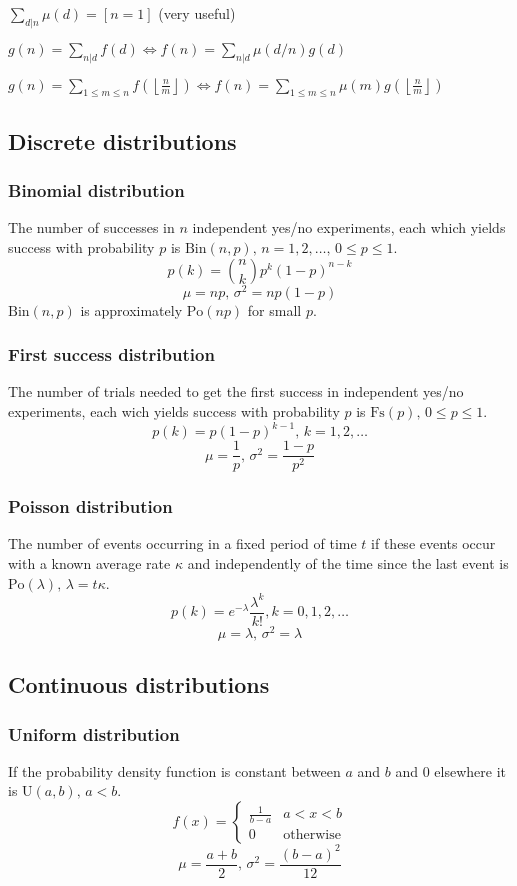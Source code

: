 \documentclass[
	a4paper,
	landscape,
	10pt,
]{article}
\begin{document}
\begin{multicols}{3}
  $ \sum_{d | n} \mu(d) = [ n = 1] $ (very useful)

  $ g(n) = \sum_{n|d} f(d) \Leftrightarrow f(n) = \sum_{n|d} \mu(d/n)g(d)$

 $ g(n) = \sum_{1 \leq m \leq n} f(\left\lfloor\frac{n}{m}\right \rfloor ) \Leftrightarrow f(n) = \sum_{1\leq m\leq n} \mu(m)g(\left\lfloor\frac{n}{m}\right\rfloor)$



\subsection{Discrete distributions}

\subsubsection*{Binomial distribution}
The number of successes in $n$ independent yes/no experiments, each which yields success with probability $p$ is $\textrm{Bin}(n,p),\,n=1,2,\dots,\, 0\leq p\leq1$.
\[p(k)=\binom{n}{k}p^k(1-p)^{n-k}\]
\[\mu = np,\,\sigma^2=np(1-p)\]
$\textrm{Bin}(n,p)$ is approximately $\textrm{Po}(np)$ for small $p$.

\subsubsection*{First success distribution}
The number of trials needed to get the first success in independent yes/no experiments, each wich yields success with probability $p$ is $\textrm{Fs}(p),\,0\leq p\leq1$.
\[p(k)=p(1-p)^{k-1},\,k=1,2,\dots\]
\[\mu = \frac1p,\,\sigma^2=\frac{1-p}{p^2}\]

\subsubsection*{Poisson distribution}
The number of events occurring in a fixed period of time $t$ if these events occur with a known average rate $\kappa$ and independently of the time since the last event is $\textrm{Po}(\lambda),\,\lambda=t\kappa$.
\[p(k)=e^{-\lambda}\frac{\lambda^k}{k!}, k=0,1,2,\dots\]
\[\mu=\lambda,\,\sigma^2=\lambda\]

\subsection{Continuous distributions}

\subsubsection*{Uniform distribution}
If the probability density function is constant between $a$ and $b$ and 0 elsewhere it is $\textrm{U}(a,b),\,a<b$.
\[f(x) = \left\{
\begin{array}{cl}
\frac{1}{b-a} & a<x<b\\
0 & \textrm{otherwise}
\end{array}\right.\]
\[\mu=\frac{a+b}{2},\,\sigma^2=\frac{(b-a)^2}{12}\]


\end{multicols}
\end{document}
